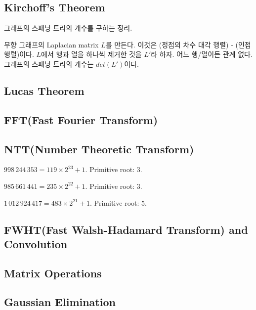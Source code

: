 \documentclass[9pt,landscape,a4paper,twocolumn]{extarticle}
\begin{document}
\subsection{Kirchoff's Theorem}

그래프의 스패닝 트리의 개수를 구하는 정리.

무향 그래프의 Laplacian matrix $L$를 만든다. 이것은 (정점의 차수 대각 행렬) - (인접행렬)이다.
$L$에서 행과 열을 하나씩 제거한 것을 $L'$라 하자. 어느 행/열이든 관계 없다.
그래프의 스패닝 트리의 개수는 $det(L')$이다.

\subsection{Lucas Theorem}


\subsection{FFT(Fast Fourier Transform)}


\subsection{NTT(Number Theoretic Transform)}


$998\,244\,353 = 119 \times 2^{23} + 1$. Primitive root: $3$.

$985\,661\,441 = 235 \times 2^{22} + 1$. Primitive root: $3$.

$1\,012\,924\,417 = 483 \times 2^{21} + 1$. Primitive root: $5$.

\subsection{FWHT(Fast Walsh-Hadamard Transform) and Convolution}


\subsection{Matrix Operations}


\subsection{Gaussian Elimination}

\end{document}
